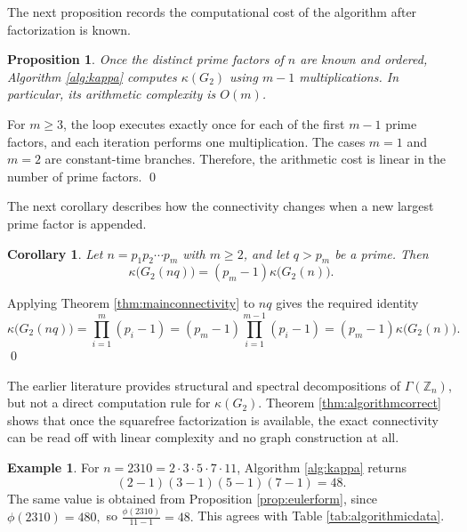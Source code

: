 \documentclass[12pt]{article}
\renewenvironment{proof}{{\bf \noindent Proof.}}{\qed}
\newtheorem{proposition}[theorem]{Proposition}
\newtheorem{corollary}[theorem]{Corollary}
\theoremstyle{definition}
\newtheorem{example}[theorem]{Example}
\begin{document}
	\medskip
	The next proposition records the computational cost of the algorithm after factorization is known.	
	\begin{proposition}\label{prop:complexity}
		Once the distinct prime factors of $n$ are known and ordered, Algorithm \ref{alg:kappa} computes $\kappa(G_2)$ using $m-1$ multiplications. In particular, its arithmetic complexity is $O(m)$.
	\end{proposition}
	
	\begin{proof}
		For $m\geq 3$, the loop executes exactly once for each of the first $m-1$ prime factors, and each iteration performs one multiplication. The cases $m=1$ and $m=2$ are constant-time branches. Therefore, the arithmetic cost is linear in the number of prime factors.
	\end{proof}
	
	\medskip
	The next corollary describes how the connectivity changes when a new largest prime factor is appended.	
	\begin{corollary}\label{cor:appendprime}
		Let $n=p_1p_2\cdots p_m$ with $m\geq 2$, and let $q>p_m$ be a prime. Then
		$$
		\kappa\big(G_2(nq)\big)=(p_m-1)\kappa\big(G_2(n)\big).
		$$
	\end{corollary}
	
	\begin{proof}
		Applying Theorem \ref{thm:mainconnectivity} to $nq$ gives the required identity
		$$
		\kappa\big(G_2(nq)\big)=\prod_{i=1}^{m}(p_i-1)=(p_m-1)\prod_{i=1}^{m-1}(p_i-1)=(p_m-1)\kappa\big(G_2(n)\big).
		$$
	\end{proof}
	
	 The earlier literature provides structural and spectral decompositions of $\Gamma(\mathbb Z_n)$, but not a direct computation rule for $\kappa(G_2)$. Theorem \ref{thm:algorithmcorrect} shows that once the squarefree factorization is available, the exact connectivity can be read off with linear complexity and no graph construction at all.
	
	\begin{example}\label{ex:algorithm}
		For $n=2310=2\cdot 3\cdot 5\cdot 7\cdot 11$, Algorithm \ref{alg:kappa} returns
		$$
		(2-1)(3-1)(5-1)(7-1)=48.
		$$
		The same value is obtained from Proposition \ref{prop:eulerform}, since
		$ \phi(2310)=480,$ so $\tfrac{\phi(2310)}{11-1}=48. $
		This agrees with Table \ref{tab:algorithmicdata}.
	\end{example}
	
\end{document}
